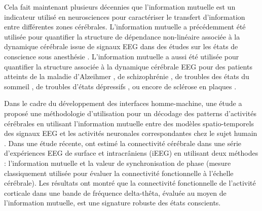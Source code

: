 Cela fait maintenant plusieurs décennies que l'information mutuelle est un indicateur utilisé en neurosciences pour caractériser le transfert d'information entre différentes zones cérébrales. 
L'information mutuelle a précédemment été utilisée pour quantifier la structure de dépendance non-linéaire associée à la dynamique cérébrale issue de signaux EEG dans des études sur les états de conscience sous anesthésie \citep{afshani2019frontal, huang2003prediction, julitta2011auto, liang2013permutation, liang2015tracking, liang2016comparison, melia2014auto}. 
L'information mutuelle a aussi été utilisée pour quantifier la structure associée à la dynamique cérébrale EEG pour des patients atteints de la maladie d'Alzeihmer \citep{abasolo2008approximate, jeong2001mutual}, de schizophrénie \citep{na2002eeg}, de troubles des états du sommeil \citep{melia2015mutual}, de troubles d'états dépressifs \citep{sun2018mutual}, ou encore de sclérose en plaques \citep{lenne2013decrease}. 

Dans le cadre du développement des interfaces homme-machine, une étude a proposé une méthodologie d'utilisation pour un décodage des patterns d'activités cérébrales en utilisant l'information mutuelle entre des modèles spatio-temporels des signaux EEG et les activités neuronales correspondantes chez le sujet humain \citep{ang2012mutual}. 
Dans une étude récente, \cite{bourdillon2020brain} ont estimé la connectivité cérébrale dans une série d'expériences EEG de surface et intracrâniens (iEEG) en utilisant deux méthodes : l'information mutuelle et la valeur de synchronisation de phase (mesure classiquement utilisée pour évaluer la connectivité fonctionnelle à l'échelle cérébrale).  
Les résultats ont montré que la connectivité fonctionnelle de l'activité corticale dans une bande de fréquence delta-thêta, évaluée au moyen de l'information mutuelle, est une signature robuste des états conscients. 

